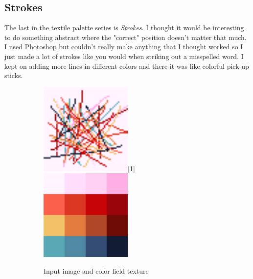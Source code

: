 \documentclass{article}
\begin{document}
\pagebreak

\subsection{Strokes}

The last in the textile palette series is \emph{Strokes}. I thought it
would be interesting to do something abstract where the "correct"
position doesn't matter that much. I used Photoshop but couldn't really
make anything that I thought worked so I just made a lot of strokes like
you would when striking out a misspelled word. I kept on adding more
lines in different colors and there it was like colorful pick-up
sticks.


\begin{figure}[ht!]
\centering
  \begin{subfigure}[t]{0.45\textwidth}
    \centering
    \includegraphics[width=0.5\textwidth]{images/lines/input_0.png}\scalebox{-1}[1]{\includegraphics[width=0.5\textwidth]{images/lines/texture.png}}
    \caption{Input image and color field texture}
  \end{subfigure}
  \begin{subfigure}[t]{0.45\textwidth}
    \centering

\end{subfigure}
\end{figure}
\end{document}
